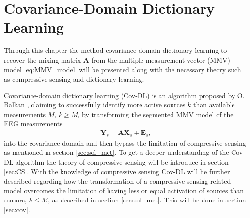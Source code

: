 \chapter{Covariance-Domain Dictionary \\ Learning}\label{ch:Cov-DL}
Through this chapter the method covariance-domain dictionary learning to recover the mixing matrix $\mathbf{A}$ from the multiple measurement vector (MMV) model \eqref{eq:MMV_model} will be presented along with the necessary theory such as compressive sensing and dictionary learning.

Covariance-domain dictionary learning (Cov-DL) is an algorithm proposed by O. Balkan \cite{Balkan2015}, claiming to successfully identify more active sources $k$ than available measurements $M$, $k \geq M$, by transforming the segmented MMV model of the EEG measurements
\begin{align*}
\mathbf{Y}_s = \mathbf{A} \mathbf{X}_s + \textbf{E}_s,
\end{align*}
into the covariance domain and then bypass the limitation of compressive sensing as mentioned in section \ref{sec:sol_met}. 
To get a deeper understanding of the Cov-DL algorithm the theory of compressive sensing will be introduce in section \ref{sec:CS}. 
With the knowledge of compressive sensing Cov-DL will be further described regarding how the transformation of a compressive sensing related model overcomes the limitation of having less or equal activation of sources than sensors, $k \leq M$, as described in section \ref{sec:sol_met}. This will be done in section \ref{sec:cov}.





